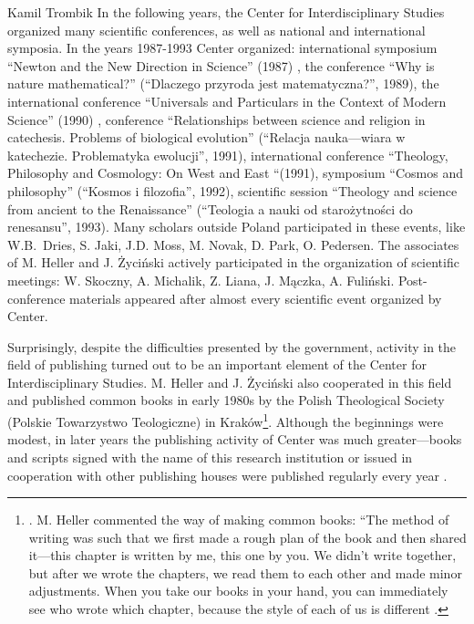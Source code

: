 \begin{artengenv}{Kamil Trombik}
In the following years, the Center for Interdisciplinary Studies organized many scientific conferences, as well as
national and international symposia. In the years 1987-1993 Center organized: international symposium ``Newton and the
New Direction in Science'' (1987) , the conference ``Why is nature mathematical?'' (``Dlaczego przyroda jest
matematyczna?'', 1989), the international conference ``Universals and Particulars in the Context of Modern Science''
(1990) , conference ``Relationships between science and religion in catechesis. Problems of biological evolution''
(``Relacja nauka---wiara w katechezie. Problematyka ewolucji'', 1991), international conference ``Theology, Philosophy and
Cosmology: On West and East ``(1991), symposium ``Cosmos and philosophy'' (``Kosmos i filozofia'', 1992), scientific session
``Theology and science from ancient to the Renaissance'' (``Teologia a nauki od starożytności do renesansu'', 1993). Many
scholars outside Poland participated in these events, like W.B.~Dries, S. Jaki, J.D. Moss, M. Novak, D. Park, O.
Pedersen. The associates of M. Heller and J. Życiński actively participated in the organization of scientific meetings:
W. Skoczny, A. Michalik, Z. Liana, J. Mączka, A. Fuliński. Post-conference materials appeared after almost every
scientific event organized by Center.

Surprisingly, despite the difficulties presented by the government, activity in the field of publishing turned out to be
an important element of the Center for Interdisciplinary Studies. M. Heller and J. Życiński also cooperated in this
field and published common books in early 1980s by the Polish Theological Society (Polskie Towarzystwo Teologiczne) in
Kraków\footnote{\parencites{heller_wszechswiat_1980,heller_drogi_1983}.
	M. Heller commented the way of making
common books: ``The method of writing was such that we first made a rough plan of the book and then shared it---this
chapter is written by me, this one by you. We didn't write together, but after we wrote the chapters, we read them to
each other and made minor adjustments. When you take our books in your hand, you can immediately see who wrote which
chapter, because the style of each of us is different
\parencite[p.231]{heller_wierze_2016}.
}. Although
the beginnings were modest, in later years the publishing activity of Center was much greater---books and scripts signed
with the name of this research institution or issued in cooperation with other publishing houses were published
regularly every year
\parencite[e.g.][]{heller_filozofowac_1987,coyne_newton_1988,heller_matematycznosc_1990,%
	mcmullin_ewolucja_1990,heller_spor_1991,wolak_neotomizm_1993}.


\end{artengenv}
